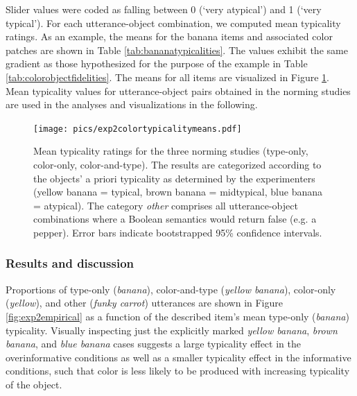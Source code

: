 \documentclass[11pt]{article}
\newcommand{\ndg}[1]{\textcolor{Green}{[ndg: #1]}}
\newcommand{\tableref}[1]{Table \ref{#1}}
\newcommand{\figref}[1]{Figure \ref{#1}}
\begin{document}
Slider values were coded as falling between 0 (`very atypical') and 1 (`very typical'). 
For each utterance-object combination, we computed mean typicality ratings. 
As an example, the means for the banana items and associated color patches are shown in \tableref{tab:bananatypicalities}. 
The values exhibit the same gradient as those hypothesized for the purpose of the example in \tableref{tab:colorobjectfidelities}. 
The means for all items are visualized in \figref{fig:exp2colortypicalitymeans}.
Mean typicality values for utterance-object pairs obtained in the norming studies are used in the analyses and visualizations in the following.

\begin{figure}
	\centering
	\texttt{[image: pics/exp2colortypicalitymeans.pdf]}
	\caption{Mean typicality ratings for the three norming studies (type-only, color-only, color-and-type). The results are categorized according to the objects' a priori typicality as determined by the experimenters (yellow banana = typical, brown banana = midtypical, blue banana = atypical). The category \emph{other} comprises all utterance-object combinations where a Boolean semantics would return false (e.g. a pepper). Error bars indicate bootstrapped 95\% confidence intervals.}
	\label{fig:exp2colortypicalitymeans}
\end{figure}


\subsubsection{Results and discussion}

Proportions of type-only (\emph{banana}), color-and-type (\emph{yellow banana}), color-only (\emph{yellow}), and other (\emph{funky carrot}) utterances are shown in \figref{fig:exp2empirical} as a function of the described item's mean type-only (\emph{banana}) typicality. Visually inspecting just the explicitly marked \emph{yellow banana}, \emph{brown banana}, and \emph{blue banana} cases suggests a large typicality effect in the overinformative conditions as well as a smaller typicality effect in the informative conditions, such that color is less likely to be produced with increasing typicality of the object. 
\end{document}
